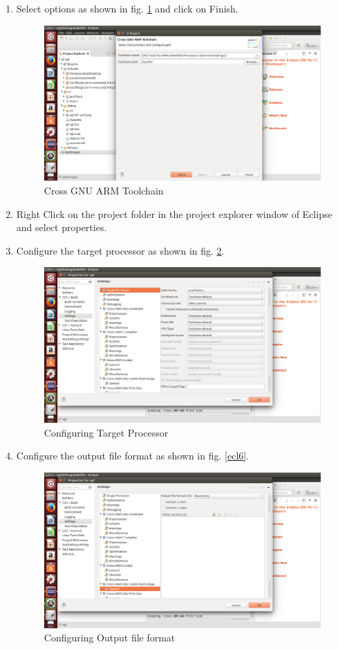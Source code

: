 \documentclass[20pt]{report}
\begin{document}
\begin{enumerate}
\item Select options as shown in fig. \ref{ecl4} and click on Finish.
\begin{figure}[!h]
\centering
\includegraphics[width=0.7\linewidth]{ecl4}
\caption{Cross GNU ARM Toolchain}
\label{ecl4}
\end{figure}
\item Right Click on the project folder in the project explorer window of Eclipse and select properties.
\item Configure the target processor as shown in fig. \ref{ecl5}.
\begin{figure}[!h]
\centering
\includegraphics[width=0.7\linewidth]{ecl5}
\caption{Configuring Target Processor}
\label{ecl5}
\end{figure}
\item Configure the output file format as shown in fig. \ref{ecl6}.
\begin{figure}[!h]
\centering
\includegraphics[width=0.7\linewidth]{ecl6}
\caption{Configuring Output file format}

\end{figure}
\end{enumerate}
\end{document}
